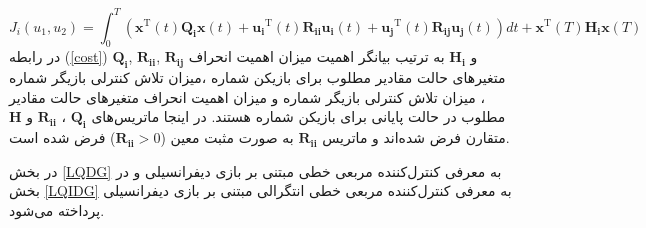  \begin{equation}\label{cost}
 	J_i(u_1, u_2) = \int_{0}^{T}\left( \boldsymbol{x} ^\mathrm{T}(t) \boldsymbol{Q_i} \boldsymbol{x}(t)+
 	 \boldsymbol{u_i} ^\mathrm{T}(t) \boldsymbol{R_{ii}} \boldsymbol{u_i}(t)+
 	 \boldsymbol{u_j} ^\mathrm{T}(t)\boldsymbol{ R_{ij} u_j}(t)
 	\right)dt+
 	\boldsymbol{ x} ^\mathrm{T}(T)\boldsymbol{ H_i}\boldsymbol{ x}(T) 
  \end{equation}
در رابطه
(\ref{cost})
$\boldsymbol{Q_i}$, $\boldsymbol{R_{ii}}$, $\boldsymbol{R_{ij}}$
و
$\boldsymbol{H_i}$
به ترتیب بیانگر اهمیت میزان اهمیت انحراف متغیرهای حالت مقادیر مطلوب برای بازیکن شماره  ،میزان تلاش کنترلی بازیگر شماره  ، میزان تلاش کنترلی بازیگر شماره   و میزان اهمیت انحراف متغیرهای حالت مقادیر مطلوب در حالت پایانی برای بازیکن شماره   هستند.
در اینجا ماتریس‌های 
$\boldsymbol{Q_i}$ ، $\boldsymbol{R_{ii}}$
و
$\boldsymbol{H}$
متقارن فرض شده‌اند و ماتریس 
$\boldsymbol{R_{ii}}$
به صورت مثبت معین ($\boldsymbol{R_{ii}}>0$)
فرض شده است.

در بخش
\ref{LQDG}
به معرفی
کنترل‌کننده مربعی خطی مبتنی بر بازی دیفرانسیلی و در بخش
\ref{LQIDG}
به معرفی
کنترل‌کننده مربعی خطی انتگرالی مبتنی بر بازی دیفرانسیلی پرداخته می‌شود.
